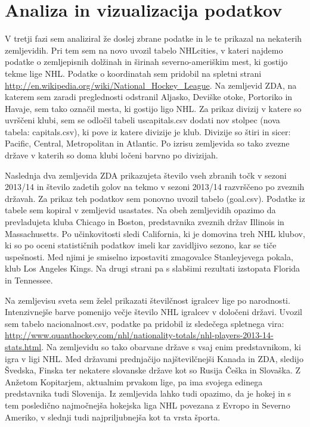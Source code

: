 \documentclass[11pt,a4paper]{article}
\begin{document}



\section{Analiza in vizualizacija podatkov}

V tretji fazi sem analiziral že doslej zbrane podatke in le te prikazal na nekaterih zemljevidih. Pri tem sem na novo uvozil tabelo NHLcities, v kateri najdemo podatke o zemljepisnih dolžinah in širinah severno-ameriškim mest, ki gostijo tekme lige NHL. Podatke o koordinatah sem pridobil na spletni strani \url{http://en.wikipedia.org/wiki/National_Hockey_League}. Na zemljevid ZDA, na katerem sem zaradi preglednosti odstranil Aljasko, Deviške otoke, Portoriko in Havaje, sem tako označil mesta, ki gostijo ligo NHL.
Za prikaz divizij v katere so uvrščeni klubi, sem se odločil tabeli uscapitals.csv dodati nov stolpec (nova tabela: capitals.csv), ki pove iz katere divizije je klub. Divizije so štiri in sicer: Pacific, Central, Metropolitan in Atlantic. Po izrisu zemljevida so tako zvezne države v katerih so doma klubi ločeni barvno po divizijah. 

Naslednja dva zemljevida ZDA prikazujeta število vseh zbranih točk v sezoni 2013/14 in število zadetih golov na tekmo v sezoni 2013/14 razvrščeno po zveznih državah. Za prikaz teh podatkov sem ponovno uvozil tabelo (goal.csv). Podatke iz tabele sem kopiral v zemljevid usastates. Na obeh zemljevidih opazimo da prevladujeta kluba Chicago in Boston, predstavnika zveznih držav Illinois in Massachusetts. Po učinkovitosti sledi California, ki je domovina treh NHL klubov, ki so po oceni statističnih podatkov imeli kar zavidljivo sezono, kar se tiče uspešnosti. Med njimi je smiselno izpostaviti zmagovalce Stanleyjevega pokala, klub Los Angeles Kings. Na drugi strani pa s slabšimi rezultati izstopata Florida in Tennessee.

Na zemljevisu sveta sem želel prikazati številčnost igralcev lige po narodnosti. Intenzivnejše barve pomenijo večje število NHL igralcev v določeni državi. Uvozil sem tabelo nacionalnost.csv, podatke pa pridobil iz sledečega spletnega vira: \url{http://www.quanthockey.com/nhl/nationality-totals/nhl-players-2013-14-stats.html}. Na zemljevidu so tako obarvane države s vsaj enim predstavnikom, ki igra v ligi NHL. Med državami prednjačijo najštevilčnejši Kanada in ZDA, sledijo Švedska, Finska ter nekatere slovanske države kot so Rusija Češka in Slovaška. Z Anžetom Kopitarjem, aktualnim prvakom lige, pa ima svojega edinega predstavnika tudi Slovenija. Iz zemljevida lahko tudi opazimo, da je hokej in s tem posledično najmočnejša hokejska liga NHL povezana z Evropo in Severno Ameriko, v slednji tudi najpriljubnejša kot ta vrsta športa.
\newpage
\end{document}
